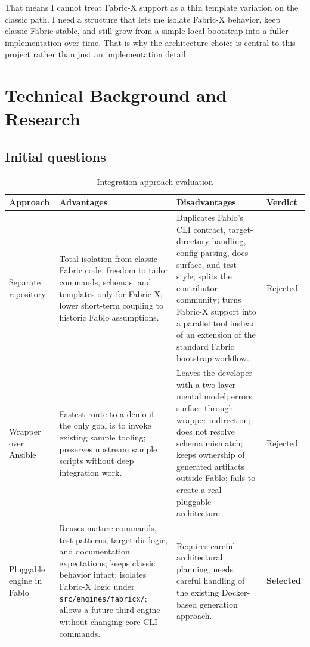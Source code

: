 That means I cannot treat Fabric-X support as a thin template variation on the classic path. I need a structure that lets me isolate Fabric-X behavior, keep classic Fabric stable, and still grow from a simple local bootstrap into a fuller implementation over time. That is why the architecture choice is central to this project rather than just an implementation detail.

\section{Technical Background and Research}

\subsection{Initial questions}

\begin{table}[h]
\centering
\begin{tabularx}{\textwidth}{|p{2.6cm}|X|X|p{1.6cm}|}
\hline
\textbf{Approach} & \textbf{Advantages} & \textbf{Disadvantages} & \textbf{Verdict} \\
\hline
Separate repository & Total isolation from classic Fabric code; freedom to tailor commands, schemas, and templates only for Fabric-X; lower short-term coupling to historic Fablo assumptions. & Duplicates Fablo's CLI contract, target-directory handling, config parsing, docs surface, and test style; splits the contributor community; turns Fabric-X support into a parallel tool instead of an extension of the standard Fabric bootstrap workflow. & Rejected \\
\hline
Wrapper over Ansible & Fastest route to a demo if the only goal is to invoke existing sample tooling; preserves upstream sample scripts without deep integration work. & Leaves the developer with a two-layer mental model; errors surface through wrapper indirection; does not resolve schema mismatch; keeps ownership of generated artifacts outside Fablo; fails to create a real pluggable architecture. & Rejected \\
\hline
Pluggable engine in Fablo & Reuses mature commands, test patterns, target-dir logic, and documentation expectations; keeps classic behavior intact; isolates Fabric-X logic under \texttt{src/engines/fabricx/}; allows a future third engine without changing core CLI commands. & Requires careful architectural planning; needs careful handling of the existing Docker-based generation approach. & \textbf{Selected} \\
\hline
\end{tabularx}
\caption{Integration approach evaluation}
\label{tab:approaches}
\end{table}

